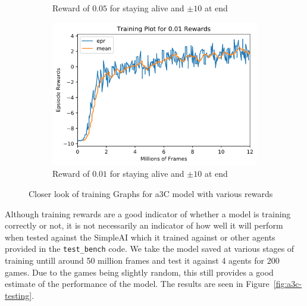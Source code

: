 \begin{figure}[ht!]
\begin{subfigure}{0.49\textwidth}
        \caption{Reward of $0.05$ for staying alive and $\pm 10$ at end}
        \label{fig:training-close-a3c-05}
    \end{subfigure}
    
    \begin{subfigure}{0.49\textwidth}
        \centering
        \includegraphics[width=\textwidth]{figures/a3c-training-0-01_close.png}
        \caption{Reward of $0.01$ for staying alive and $\pm 10$ at end}
        \label{fig:training-close-a3c-01}
    \end{subfigure}
    \caption{Closer look of training Graphs for a3C model with various rewards}
    \label{fig:a3c-training-close}
\end{figure}

Although training rewards are a good indicator of whether a model is training correctly or not, it is not necessarily an indicator of how well it will perform when tested against the SimpleAI which it trained against or other agents provided in the \texttt{test\_bench} code. We take the model saved at various stages of training untill around 50 million frames and test it against 4 agents for 200 games. Due to the games being slightly random, this still provides a good estimate of the performance of the model. The results are seen in Figure~\ref{fig:a3c-testing}.

